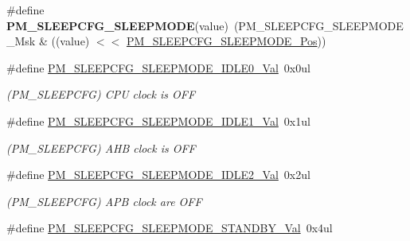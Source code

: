 \begin{DoxyCompactItemize}
\item 
\hypertarget{group___s_a_m_l21___p_m_gae8c1cf5a4e7bb49d99f20b8bf5839341}{}\#define {\bfseries P\+M\+\_\+\+S\+L\+E\+E\+P\+C\+F\+G\+\_\+\+S\+L\+E\+E\+P\+M\+O\+D\+E}(value)~(P\+M\+\_\+\+S\+L\+E\+E\+P\+C\+F\+G\+\_\+\+S\+L\+E\+E\+P\+M\+O\+D\+E\+\_\+\+Msk \& ((value) $<$$<$ \hyperlink{group___s_a_m_l21___p_m_ga35bc67c3429373f2ad67992a2c731a59}{P\+M\+\_\+\+S\+L\+E\+E\+P\+C\+F\+G\+\_\+\+S\+L\+E\+E\+P\+M\+O\+D\+E\+\_\+\+Pos}))\label{group___s_a_m_l21___p_m_gae8c1cf5a4e7bb49d99f20b8bf5839341}

\item 
\hypertarget{group___s_a_m_l21___p_m_gaeac8be8e55515e28ce319c353cb7f1e2}{}\#define \hyperlink{group___s_a_m_l21___p_m_gaeac8be8e55515e28ce319c353cb7f1e2}{P\+M\+\_\+\+S\+L\+E\+E\+P\+C\+F\+G\+\_\+\+S\+L\+E\+E\+P\+M\+O\+D\+E\+\_\+\+I\+D\+L\+E0\+\_\+\+Val}~0x0ul\label{group___s_a_m_l21___p_m_gaeac8be8e55515e28ce319c353cb7f1e2}

\begin{DoxyCompactList}\small\item\em (P\+M\+\_\+\+S\+L\+E\+E\+P\+C\+F\+G) C\+P\+U clock is O\+F\+F \end{DoxyCompactList}\item 
\hypertarget{group___s_a_m_l21___p_m_gaffca82a32fcc77efc796ad8113fc2624}{}\#define \hyperlink{group___s_a_m_l21___p_m_gaffca82a32fcc77efc796ad8113fc2624}{P\+M\+\_\+\+S\+L\+E\+E\+P\+C\+F\+G\+\_\+\+S\+L\+E\+E\+P\+M\+O\+D\+E\+\_\+\+I\+D\+L\+E1\+\_\+\+Val}~0x1ul\label{group___s_a_m_l21___p_m_gaffca82a32fcc77efc796ad8113fc2624}

\begin{DoxyCompactList}\small\item\em (P\+M\+\_\+\+S\+L\+E\+E\+P\+C\+F\+G) A\+H\+B clock is O\+F\+F \end{DoxyCompactList}\item 
\hypertarget{group___s_a_m_l21___p_m_gaa39bc5c9c9144b45a525dbac465c4603}{}\#define \hyperlink{group___s_a_m_l21___p_m_gaa39bc5c9c9144b45a525dbac465c4603}{P\+M\+\_\+\+S\+L\+E\+E\+P\+C\+F\+G\+\_\+\+S\+L\+E\+E\+P\+M\+O\+D\+E\+\_\+\+I\+D\+L\+E2\+\_\+\+Val}~0x2ul\label{group___s_a_m_l21___p_m_gaa39bc5c9c9144b45a525dbac465c4603}

\begin{DoxyCompactList}\small\item\em (P\+M\+\_\+\+S\+L\+E\+E\+P\+C\+F\+G) A\+P\+B clock are O\+F\+F \end{DoxyCompactList}\item 
\hypertarget{group___s_a_m_l21___p_m_gafad7594ad3c4bf0e456b4686140360c1}{}\#define \hyperlink{group___s_a_m_l21___p_m_gafad7594ad3c4bf0e456b4686140360c1}{P\+M\+\_\+\+S\+L\+E\+E\+P\+C\+F\+G\+\_\+\+S\+L\+E\+E\+P\+M\+O\+D\+E\+\_\+\+S\+T\+A\+N\+D\+B\+Y\+\_\+\+Val}~0x4ul\label{group___s_a_m_l21___p_m_gafad7594ad3c4bf0e456b4686140360c1}


\end{DoxyCompactItemize}
